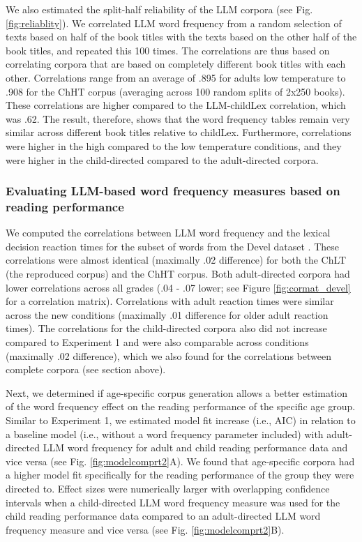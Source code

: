 \documentclass[doc, a4paper]{apa7}
\begin{document}
We also estimated the split-half reliability of the LLM corpora (see Fig. \ref{fig:reliablity}). We correlated LLM word frequency from a random selection of texts based on half of the book titles with the texts based on the other half of the book titles, and repeated this 100 times. The correlations are thus based on correlating corpora that are based on completely different book titles with each other. Correlations range from an average of .895 for adults low temperature to .908 for the ChHT corpus (averaging across 100 random splits of 2x250 books). These correlations are higher compared to the LLM-childLex correlation, which was .62. The result, therefore, shows that the word frequency tables remain very similar across different book titles relative to childLex. Furthermore, correlations were higher in the high compared to the low temperature conditions, and they were higher in the child-directed compared to the adult-directed corpora. 


\subsubsection*{Evaluating LLM-based word frequency measures based on reading performance}

We computed the correlations between LLM word frequency and the lexical decision reaction times for the subset of words from the Devel dataset \citep{schroter_developmental_2017}. These correlations were almost identical (maximally .02 difference) for both the ChLT (the reproduced corpus) and the ChHT corpus. Both adult-directed corpora had lower correlations across all grades (.04 - .07 lower; see Figure \ref{fig:cormat_devel} for a correlation matrix). Correlations with adult reaction times were similar across the new conditions (maximally .01 difference for older adult reaction times). The correlations for the child-directed corpora also did not increase compared to Experiment 1 and were also comparable across conditions (maximally .02 difference), which we also found for the correlations between complete corpora (see section above). 

Next, we determined if age-specific corpus generation allows a better estimation of the word frequency effect on the reading performance of the specific age group. Similar to Experiment 1, we estimated model fit increase (i.e.,  AIC) in relation to a baseline model (i.e., without a word frequency parameter included) with adult-directed LLM word frequency for adult and child reading performance data and vice versa (see Fig. \ref{fig:modelcomprt2}A). We found that age-specific corpora had a higher model fit specifically for the reading performance of the group they were directed to. Effect sizes were numerically larger with overlapping confidence intervals when a child-directed LLM word frequency measure was used for the child reading performance data compared to an adult-directed LLM word frequency measure and vice versa (see Fig. \ref{fig:modelcomprt2}B).
\end{document}
